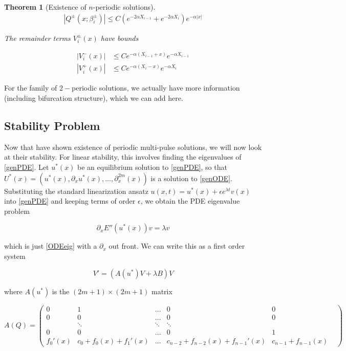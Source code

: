\documentclass[12pt]{article}
\newtheorem{theorem}{Theorem}
\begin{document}
\begin{theorem}[Existence of $n$-periodic solutions]
\begin{align*}
|Q^\pm(x; \beta_i^\pm)| \leq C (e^{-2 \alpha X_{i-1}} + e^{-2 \alpha X_i})e^{-\alpha |x|}
\end{align*} 

The remainder terms $V_i^\pm(x)$ have bounds

\begin{align}
|V_i^-(x)| &\leq C e^{-\alpha(X_{i-1} + x)}e^{-\alpha X_{i-1}} \\
|V_i^+(x)| &\leq C e^{-\alpha(X_i - x)}e^{-\alpha X_i} 
\end{align} 
\end{theorem}

For the family of $2-$periodic solutions, we actually have more information (including bifurcation structure), which we can add here.

\subsection{Stability Problem}

Now that have shown existence of periodic multi-pulse solutions, we will now look at their stability. For linear stability, this involves finding the eigenvalues of \eqref{genPDE}. Let $u^*(x)$ be an equilibrium solution to \eqref{genPDE}, so that $U^*(x) = (u^*(x), \partial_x u^*(x), \dots, \partial_x^{2m}(x))$ is a solution to \eqref{genODE}. Substituting the standard linearization ansatz $u(x, t) = u^*(x) + \epsilon e^{\lambda t}v(x)$ into \eqref{genPDE} and keeping terms of order $\epsilon$, we obtain the PDE eigenvalue problem

\begin{equation}\label{PDEeig}
\partial_x E''(u^*(x)) v = \lambda v
\end{equation}

which is just \eqref{ODEeig} with a $\partial_x$ out front. We can write this as a first order system 

\begin{equation}\label{PDEeig2}
V' = ( A(u^*)V + \lambda B)V 
\end{equation}

where $A(u^*)$ is the $(2m+1) \times (2m+1)$ matrix

\begin{equation}
A(Q) = \begin{pmatrix}
0 & 1 & \dots & 0 & 0 \\
0 & 0 & \dots & 0 & 0 \\
& \ddots & \ddots & \ddots & & \\
0 & 0 & \dots & 0 & 1 \\
f_0'(x) & c_0 + f_0(x) + f_1'(x) & \dots & c_{n-2} + f_{n-2}(x) + f_{n-1}'(x) & c_{n-1} + f_{n-1}(x)
\end{pmatrix}
\end{equation}
\end{document}

